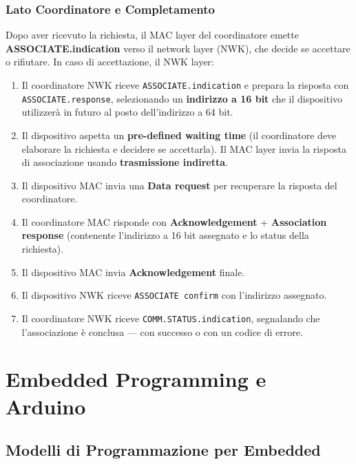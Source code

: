 \documentclass[
  italian,
  openany]{book}
\providecommand{\tightlist}{%
  \setlength{\itemsep}{0pt}\setlength{\parskip}{0pt}}
\begin{document}
\subsection{Lato Coordinatore e
Completamento}\label{lato-coordinatore-e-completamento}

Dopo aver ricevuto la richiesta, il MAC layer del coordinatore emette
\textbf{ASSOCIATE.indication} verso il network layer (NWK), che decide
se accettare o rifiutare. In caso di accettazione, il NWK layer:

\begin{enumerate}
\def\labelenumi{\arabic{enumi}.}
\setcounter{enumi}{3}
\tightlist
\item
  Il coordinatore NWK riceve \texttt{ASSOCIATE.indication} e prepara la
  risposta con \texttt{ASSOCIATE.response}, selezionando un
  \textbf{indirizzo a 16 bit} che il dispositivo utilizzerà in futuro al
  posto dell'indirizzo a 64 bit.
\item
  Il dispositivo aspetta un \textbf{pre-defined waiting time} (il
  coordinatore deve elaborare la richiesta e decidere se accettarla). Il
  MAC layer invia la risposta di associazione usando
  \textbf{trasmissione indiretta}.
\item
  Il dispositivo MAC invia una \textbf{Data request} per recuperare la
  risposta del coordinatore.
\item
  Il coordinatore MAC risponde con \textbf{Acknowledgement} +
  \textbf{Association response} (contenente l'indirizzo a 16 bit
  assegnato e lo status della richiesta).
\item
  Il dispositivo MAC invia \textbf{Acknowledgement} finale.
\item
  Il dispositivo NWK riceve \texttt{ASSOCIATE\ confirm} con l'indirizzo
  assegnato.
\item
  Il coordinatore NWK riceve \texttt{COMM.STATUS.indication}, segnalando
  che l'associazione è conclusa --- con successo o con un codice di
  errore.
\end{enumerate}

\newpage

\chapter{Embedded Programming e
Arduino}\label{embedded-programming-e-arduino}

\section{Modelli di Programmazione per
Embedded}\label{modelli-di-programmazione-per-embedded}
\end{document}
